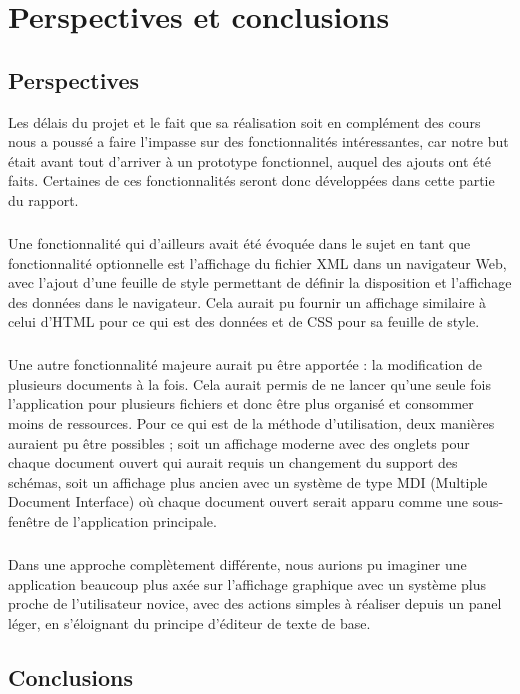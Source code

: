 \chapter{Perspectives et conclusions}
	\section{Perspectives}
Les délais du projet et le fait que sa réalisation soit en complément des cours nous a poussé a faire l'impasse sur des fonctionnalités intéressantes, car notre but était avant tout d'arriver à un prototype fonctionnel, auquel des ajouts ont été faits. Certaines de ces fonctionnalités seront donc développées dans cette partie du rapport.
\paragraph{}

Une fonctionnalité qui d'ailleurs avait été évoquée dans le sujet en tant que fonctionnalité optionnelle est l'affichage du fichier XML dans un navigateur Web, avec l'ajout d'une feuille de style permettant de définir la disposition et l'affichage des données dans le navigateur. Cela aurait pu fournir un affichage similaire à celui d'HTML pour ce qui est des données et de CSS pour sa feuille de style.
\paragraph{}

Une autre fonctionnalité majeure aurait pu être apportée : la modification de plusieurs documents à la fois. Cela aurait permis de ne lancer qu'une seule fois l'application pour plusieurs fichiers et donc être plus organisé et consommer moins de ressources. Pour ce qui est de la méthode d'utilisation, deux manières auraient pu être possibles ; soit un affichage moderne avec des onglets pour chaque document ouvert qui aurait requis un changement du support des schémas, soit un affichage plus ancien avec un système de type MDI (Multiple Document Interface) où chaque document ouvert serait apparu comme une sous-fenêtre de l'application principale.
\paragraph{}

Dans une approche complètement différente, nous aurions pu imaginer une application beaucoup plus axée sur l'affichage graphique avec un système plus proche de l'utilisateur novice, avec des actions simples à réaliser depuis un panel léger, en s'éloignant du principe d'éditeur de texte de base.

	\section{Conclusions}